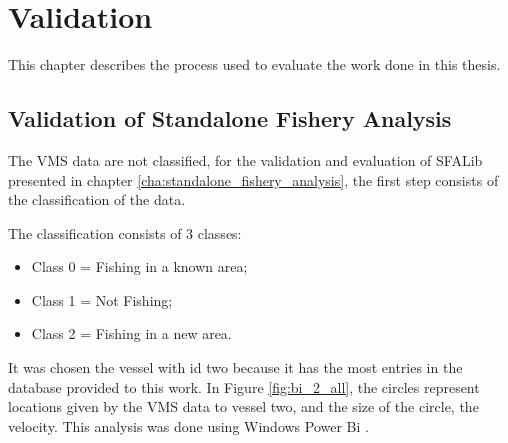 % 
% 
%
\chapter{Validation}
\label{cha:validation}

This chapter describes the process used to evaluate the work done in this thesis.

\section{Validation of Standalone Fishery Analysis} %
\label{sec:val_SFA}

The VMS data are not classified, for the validation and evaluation of SFALib presented in chapter \ref{cha:standalone_fishery_analysis}, the first step consists of the classification of the data.

The classification consists of 3 classes:
\begin{itemize}
\item Class 0 = Fishing in a known area;
\item Class 1 = Not Fishing;
\item Class 2 = Fishing in a new area.
\end{itemize} 


It was chosen the vessel with id two because it has the most entries in the database provided to this work. In Figure \ref{fig:bi_2_all}, the circles represent locations given by the VMS data to vessel two, and the size of the circle, the velocity. This analysis was done using Windows Power Bi \cite{WEBSITE:PowerBi}.

